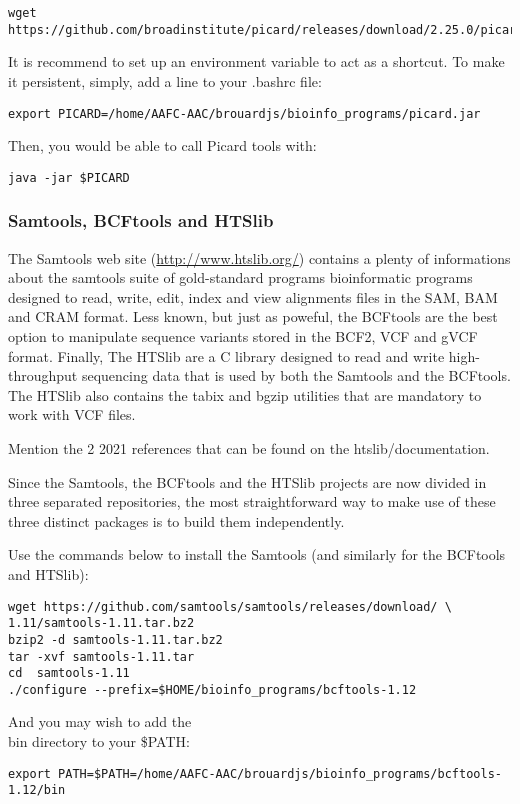 \begin{verbatim}
wget https://github.com/broadinstitute/picard/releases/download/2.25.0/picard.jar
\end{verbatim}

It is recommend to set up an environment variable to act as a shortcut. To make it persistent, simply, add a line to your .bashrc file:

\begin{verbatim}
export PICARD=/home/AAFC-AAC/brouardjs/bioinfo_programs/picard.jar
\end{verbatim}

Then, you would be able to call Picard tools with:

\begin{verbatim}
java -jar $PICARD
\end{verbatim}


\subsubsection{Samtools, BCFtools and HTSlib}


The Samtools web site (\href{http://www.htslib.org/}{http://www.htslib.org/}) contains a plenty of informations about the samtools suite of gold-standard programs bioinformatic programs designed to read, write, edit, index and view alignments files in the SAM, BAM and CRAM format. Less known, but just as poweful, the BCFtools are the best option to manipulate sequence variants stored in the BCF2, VCF and gVCF format. Finally, The HTSlib are a C library designed to read and write high-throughput sequencing data that is used by both the Samtools and the BCFtools. The HTSlib also contains the tabix and bgzip utilities that are mandatory to work with VCF files.

Mention the 2 2021 references that can be found on the htslib/documentation.

Since the Samtools, the BCFtools and the HTSlib projects are now divided in three separated repositories, the most straightforward way to make use of these three distinct packages is to build them independently. 

Use the commands below to install the Samtools (and similarly for the BCFtools and HTSlib):

\begin{verbatim}
wget https://github.com/samtools/samtools/releases/download/ \
1.11/samtools-1.11.tar.bz2
bzip2 -d samtools-1.11.tar.bz2	
tar -xvf samtools-1.11.tar
cd  samtools-1.11
./configure --prefix=$HOME/bioinfo_programs/bcftools-1.12
\end{verbatim}

And you may wish to add the \\bin directory to your \$PATH:

\begin{verbatim}
export PATH=$PATH=/home/AAFC-AAC/brouardjs/bioinfo_programs/bcftools-1.12/bin
\end{verbatim}









